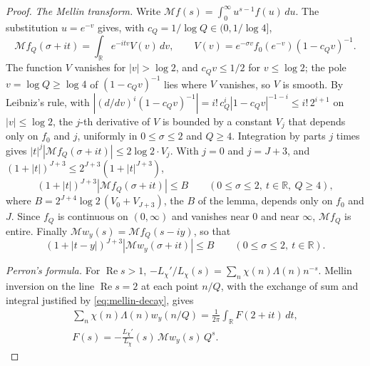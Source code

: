 \documentclass[11pt]{article}
\numberwithin{equation}{section}
\begin{document}
\begin{proof}
\emph{The Mellin transform.} Write $\mathcal M f(s) = \int_0^\infty u^{s - 1} f(u) \, du$. The substitution
$u = e^{-v}$ gives, with $c_Q = 1/\log Q \in (0, 1/\log 4]$,
\[
  \mathcal M f_Q(\sigma + it) = \int_{\mathbb R} e^{-itv} V(v) \, dv, \qquad
  V(v) = e^{-\sigma v} f_0(e^{-v}) (1 - c_Q v)^{-1}.
\]
The function $V$ vanishes for $|v| > \log 2$, and $c_Q v \le 1/2$ for $v \le \log 2$; the pole $v = \log Q \ge \log 4$
of
$(1 - c_Q v)^{-1}$ lies where $V$ vanishes, so $V$ is smooth. By Leibniz's
rule, with $|(d/dv)^i (1 - c_Q v)^{-1}| = i! \, c_Q^i |1 - c_Q v|^{-1 - i} \le i! \, 2^{i + 1}$ on $|v| \le \log 2$,
the $j$-th derivative of $V$ is bounded by a constant $V_j$ that depends only on $f_0$ and $j$, uniformly in
$0 \le \sigma \le 2$ and $Q \ge 4$. Integration by parts $j$ times gives
$|t|^j |\mathcal M f_Q(\sigma + it)| \le 2 \log 2 \cdot V_j$. With $j = 0$ and $j = J + 3$, and
$(1 + |t|)^{J + 3} \le 2^{J + 3}(1 + |t|^{J + 3})$,
\[
  (1 + |t|)^{J + 3} |\mathcal M f_Q(\sigma + it)| \le B \qquad (0 \le \sigma \le 2,\ t \in \mathbb R,\ Q \ge 4),
\]
where $B = 2^{J + 4} \log 2 \, (V_0 + V_{J + 3})$, the $B$ of the lemma, depends only on $f_0$ and $J$. Since $f_Q$
is continuous on
$(0, \infty)$ and vanishes near $0$ and near $\infty$, $\mathcal M f_Q$ is entire. Finally
$\mathcal M w_y(s) = \mathcal M f_Q(s - iy)$, so that
\begin{equation}\label{eq:mellin-decay}
  (1 + |t - y|)^{J + 3} |\mathcal M w_y(\sigma + it)| \le B \qquad (0 \le \sigma \le 2,\ t \in \mathbb R).
\end{equation}

\emph{Perron's formula.} For $\operatorname{Re} s > 1$, $-L_\chi'/L_\chi(s) = \sum_n \chi(n) \Lambda(n) n^{-s}$.
Mellin inversion on the line $\operatorname{Re} s = 2$ at each point $n/Q$, with the exchange of sum and integral
justified by \eqref{eq:mellin-decay}, gives
\begin{gather*}
  \sum_n \chi(n) \Lambda(n) w_y(n/Q) = \frac1{2\pi} \int_{\mathbb R} F(2 + it) \, dt, \\
  F(s) = -\frac{L_\chi'}{L_\chi}(s) \, \mathcal M w_y(s) \, Q^s.
\end{gather*}


\end{proof}
\end{document}
